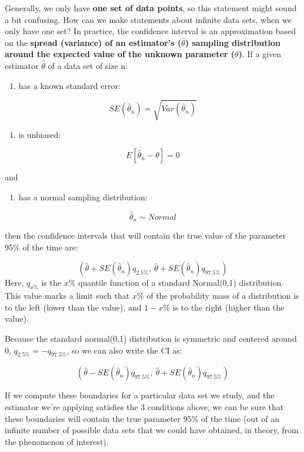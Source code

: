 \documentclass[
]{book}
\providecommand{\tightlist}{%
  \setlength{\itemsep}{0pt}\setlength{\parskip}{0pt}}
\begin{document}
Generally, we only have \textbf{one set of data points}, so this statement might sound a bit confusing. How can we make statements about infinite data sets, when we only have one set? In practice, the confidence interval is an approximation based on the \textbf{spread (variance) of an estimator's (\(\hat{\theta}\)) sampling distribution around the expected value of the unknown parameter (\(\theta\))}.
If a given estimator \(\hat{\theta}\) of a data set of size n:

\begin{enumerate}
\def\labelenumi{\arabic{enumi}.}
\tightlist
\item
  has a known standard error:
\end{enumerate}

\[SE(\hat{\theta}_n) = \sqrt{Var(\hat{\theta}_n)}\]

\begin{enumerate}
\def\labelenumi{\arabic{enumi}.}
\setcounter{enumi}{1}
\tightlist
\item
  is unbiased:
\end{enumerate}

\[E[\hat{\theta}_n - \theta] = 0\]

and

\begin{enumerate}
\def\labelenumi{\arabic{enumi}.}
\setcounter{enumi}{2}
\tightlist
\item
  has a normal sampling distribution:
\end{enumerate}

\[\hat{\theta}_n \sim Normal\]

then the confidence intervals that will contain the true value of the parameter 95\% of the time are:

\[(\hat{\theta} + SE(\hat{\theta}_n) q_{2.5\%}, \ \hat{\theta} + SE(\hat{\theta}_n) q_{97.5\%})\]
Here, \(q_{x\%}\) is the \(x\%\) quantile function of a standard Normal(0,1) distribution. This value marks a limit such that \(x\%\) of the probability mass of a distribution is to the left (lower than the value), and \(1-x\%\) is to the right (higher than the value).

Because the standard normal(0,1) distribution is symmetric and centered around 0, \(q_{2.5\%} = -q_{97.5\%}\), so we can also write the CI as:

\[(\hat{\theta} - SE(\hat{\theta}_n)  q_{97.5\%}, \
 \hat{\theta} + SE(\hat{\theta}_n) q_{97.5\%})\]

If we compute these boundaries for a particular data set we study, and the estimator we're applying satisfies the 3 conditions above, we can be sure that these boundaries will contain the true parameter \(95\%\) of the time (out of an infinite number of possible data sets that we could have obtained, in theory, from the phenomenon of interest).
\end{document}
